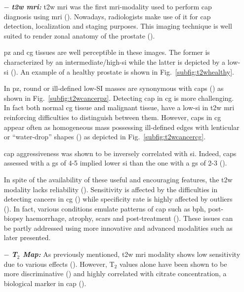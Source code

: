 \begin{enumerate}[leftmargin=*]
\item[$-$] \textbf{\textit{\ac{t2w} \ac{mri}:}} \ac{t2w} \ac{mri} was the first \ac{mri}-modality used to perform \ac{cap} diagnosis using \ac{mri} (\cite{Hricak1983}). Nowadays, radiologists make use of it for \ac{cap} detection, localization and staging purposes. This imaging technique is well suited to render zonal anatomy of the prostate (\cite{Barentsz2012}). 

\ac{pz} and \ac{cg} tissues are well perceptible in these images. The former is characterized by an intermediate/high-\ac{si} while the latter is depicted by a low-\ac{si} (\cite{Hricak1987}). An example of a healthy prostate is shown in Fig.~\ref{subfig:t2whealthy}.

In \ac{pz}, round or ill-defined low-SI masses are synonymous with \acp{cap} (\cite{Hricak1983}) as shown in Fig.~\ref{subfig:t2wcancerpz}. Detecting \ac{cap} in \ac{cg} is more challenging. In fact both normal \ac{cg} tissue and malignant tissue, have a low-\ac{si} in \ac{t2w} \ac{mri} reinforcing difficulties to distinguish between them. However, \acp{cap} in \ac{cg} appear often as homogeneous mass possessing ill-defined edges with lenticular or ``water-drop'' shapes (\cite{Akin2006, Barentsz2012}) as depicted in Fig.~\ref{subfig:t2wcancercg}. 

\ac{cap} aggressiveness was shown to be inversely correlated with \ac{si}. Indeed, \acp{cap} assessed with a \ac{gs} of 4-5 implied lower \ac{si} than the one with a \ac{gs} of 2-3 (\cite{Wang2008}).

In spite of the availability of these useful and encouraging features, the \ac{t2w} modality lacks reliability (\cite{Kirkham2006,Hoeks2011}). Sensitivity is affected by the difficulties in detecting cancers in \ac{cg} (\cite{Kirkham2006}) while specificity rate is highly affected by outliers (\cite{Barentsz2012}). In fact, various conditions emulate patterns of \ac{cap} such as \ac{bph}, post-biopsy haemorrhage, atrophy, scars and post-treatment (\cite{Hricak1987,Quint1991,Scheidler1999,Cruz2002,Barentsz2012}). These issues can be partly addressed using more innovative and advanced modalities such as later presented.

\item[$-$] \textbf{\textit{T$_2$ Map:}} As previously mentioned, \ac{t2w} \ac{mri} modality shows low sensitivity due to various effects (\cite{Hegde2013}). However, T$_2$ values alone have been shown to be more discriminative (\cite{Liu2011}) and highly correlated with citrate concentration, a biological marker in \ac{cap} (\cite{Liney1996,Liney1997}). 


\end{enumerate}
